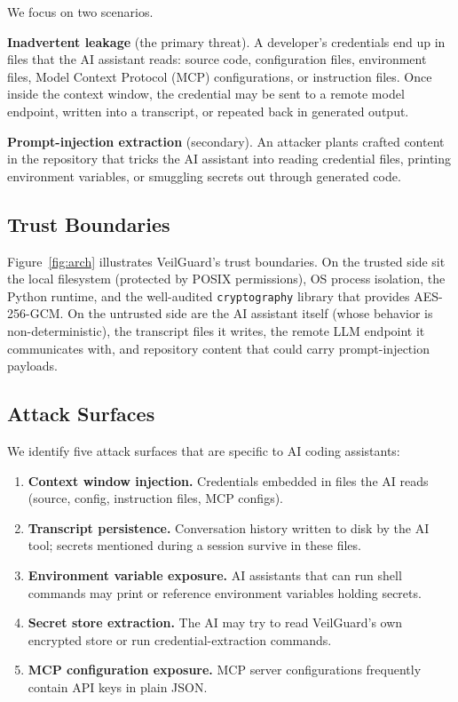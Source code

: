 \documentclass[conference]{IEEEtran}
\begin{document}
We focus on two scenarios.

\textbf{Inadvertent leakage} (the primary threat). A developer's credentials
end up in files that the AI assistant reads: source code, configuration files,
environment files, Model Context Protocol (MCP) configurations, or instruction
files. Once inside the context window, the credential may be sent to a remote
model endpoint, written into a transcript, or repeated back in generated output.

\textbf{Prompt-injection extraction} (secondary). An attacker plants crafted
content in the repository that tricks the AI assistant into reading credential
files, printing environment variables, or smuggling secrets out through
generated code.

\subsection{Trust Boundaries}

Figure~\ref{fig:arch} illustrates VeilGuard's trust boundaries. On the trusted
side sit the local filesystem (protected by POSIX permissions), OS process
isolation, the Python runtime, and the well-audited \texttt{cryptography}
library that provides AES-256-GCM. On the untrusted side are the AI assistant
itself (whose behavior is non-deterministic), the transcript files it writes,
the remote LLM endpoint it communicates with, and repository content that could
carry prompt-injection payloads.

\subsection{Attack Surfaces}

We identify five attack surfaces that are specific to AI coding assistants:

\begin{enumerate}
  \item \textbf{Context window injection.} Credentials embedded in files the AI
        reads (source, config, instruction files, MCP configs).
  \item \textbf{Transcript persistence.} Conversation history written to disk
        by the AI tool; secrets mentioned during a session survive in these
        files.
  \item \textbf{Environment variable exposure.} AI assistants that can run
        shell commands may print or reference environment variables holding
        secrets.
  \item \textbf{Secret store extraction.} The AI may try to read VeilGuard's
        own encrypted store or run credential-extraction commands.
  \item \textbf{MCP configuration exposure.} MCP server configurations
        frequently contain API keys in plain JSON.
\end{enumerate}
\end{document}
